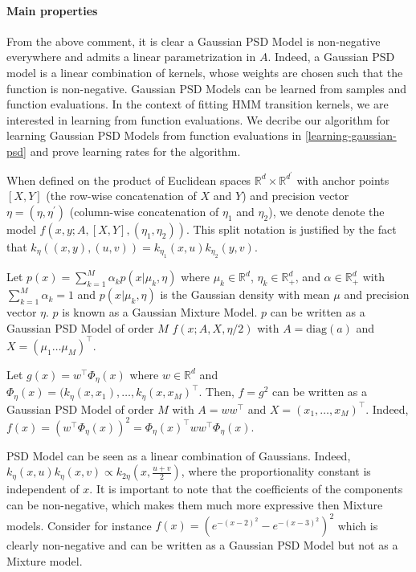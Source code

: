 \paragraph{Main properties} From the above comment, it is clear a Gaussian PSD Model is non-negative everywhere and admits a linear parametrization in $A$.  Indeed, a Gaussian PSD model is a linear combination of kernels, whose weights are chosen such that the function is non-negative. Gaussian PSD Models can be learned from samples and function evaluations. In the context of fitting HMM transition kernels, we are interested in learning from function evaluations. We decribe our algorithm for learning Gaussian PSD Models from function evaluations in \cref{learning-gaussian-psd} and prove learning rates for the algorithm.


When defined on the product of Euclidean spaces $\mathbb R^d \times \mathbb R ^{d^\prime}$ with anchor points $[X, Y]$ (the row-wise concatenation of $X$ and $Y$) and precision vector $\eta = (\eta, \eta^\prime)$ (column-wise concatenation of $\eta_1$ and $\eta_2$), we denote denote the model $f(x, y ; A, [X, Y], (\eta_1, \eta_2))$. This split notation is justified by the fact that $k_\eta((x, y), (u, v)) = k_{\eta_1}(x, u)k_{\eta_2}(y, v)$.

\begin{example}\label{ex:mixtures} Let $p(x) = \sum_{k=1}^M\alpha_kp(x|\mu_k, \eta)$ where $\mu_k\in\mathbb R^d$, $\eta_k\in\mathbb R^d_+$, and $\alpha \in\mathbb R^d_+$ with $\sum_{k=1}^M\alpha_k = 1$ and $p(x|\mu_k, \eta)$ is the Gaussian density with mean $\mu$ and precision vector $\eta$. $p$ is known as a Gaussian Mixture Model. $p$ can be written as a Gaussian PSD Model of order $M$ $f(x ; A, X, \eta / 2)$ with $A=\textrm{diag}(a)$ and $X = (\mu_1 \ldots \mu_M)^\top $.
\end{example}

\begin{example}\label{ex:sq-linear-model}
Let $g(x) = w^\top \Phi_\eta(x)$ where $w\in\mathbb R^d$ and $\Phi_\eta(x)= (k_\eta(x, x_1), \ldots, k_\eta(x, x_M)^\top $. Then, $f=g^2$ can be written as a Gaussian PSD Model of order $M$ with $A=ww^\top $ and $X = (x_1, \ldots, x_M)^\top $. Indeed, $f(x) = (w^\top \Phi_\eta(x))^2 = \Phi_\eta(x)^\top ww^\top \Phi_\eta(x)$.
\end{example}


 PSD Model can be seen as a linear combination of Gaussians. Indeed, $k_\eta(x, u)k_\eta(x, v)\propto k_{2\eta}(x, \frac{u+v}{2})$, where the proportionality constant is independent of $x$. It is important to note that the coefficients of the components can be non-negative, which makes them much more expressive then Mixture models. Consider for instance $f(x) = (e^{-(x-2)^2} - e^{-(x-3)^2})^2$ which is clearly non-negative and can be written as a Gaussian PSD Model but not as a Mixture model.

